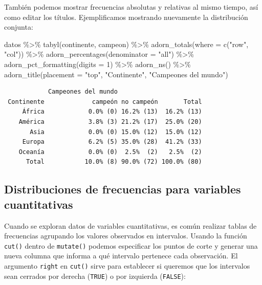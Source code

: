 \documentclass[
]{book}
\newenvironment{Shaded}{\begin{snugshade}}{\end{snugshade}}
\newcommand{\AttributeTok}[1]{\textcolor[rgb]{0.77,0.63,0.00}{#1}}
\newcommand{\DecValTok}[1]{\textcolor[rgb]{0.00,0.00,0.81}{#1}}
\newcommand{\FunctionTok}[1]{\textcolor[rgb]{0.00,0.00,0.00}{#1}}
\newcommand{\NormalTok}[1]{#1}
\newcommand{\SpecialCharTok}[1]{\textcolor[rgb]{0.00,0.00,0.00}{#1}}
\newcommand{\StringTok}[1]{\textcolor[rgb]{0.31,0.60,0.02}{#1}}
\begin{document}
También podemos mostrar frecuencias absolutas y relativas al mismo tiempo, así como editar los títulos. Ejemplificamos mostrando nuevamente la distribución conjunta:

\begin{Shaded}
\begin{Highlighting}[]
\NormalTok{datos }\SpecialCharTok{\%\textgreater{}\%} 
  \FunctionTok{tabyl}\NormalTok{(continente, campeon) }\SpecialCharTok{\%\textgreater{}\%} 
  \FunctionTok{adorn\_totals}\NormalTok{(}\AttributeTok{where =} \FunctionTok{c}\NormalTok{(}\StringTok{"row"}\NormalTok{, }\StringTok{"col"}\NormalTok{)) }\SpecialCharTok{\%\textgreater{}\%} 
  \FunctionTok{adorn\_percentages}\NormalTok{(}\AttributeTok{denominator =} \StringTok{"all"}\NormalTok{) }\SpecialCharTok{\%\textgreater{}\%} 
  \FunctionTok{adorn\_pct\_formatting}\NormalTok{(}\AttributeTok{digits =} \DecValTok{1}\NormalTok{) }\SpecialCharTok{\%\textgreater{}\%} 
  \FunctionTok{adorn\_ns}\NormalTok{() }\SpecialCharTok{\%\textgreater{}\%} 
  \FunctionTok{adorn\_title}\NormalTok{(}\AttributeTok{placement =} \StringTok{"top"}\NormalTok{, }\StringTok{"Continente"}\NormalTok{, }\StringTok{"Campeones del mundo"}\NormalTok{)}
\end{Highlighting}
\end{Shaded}

\begin{verbatim}
            Campeones del mundo                       
 Continente             campeón no campeón       Total
     África            0.0% (0) 16.2% (13)  16.2% (13)
    América            3.8% (3) 21.2% (17)  25.0% (20)
       Asia            0.0% (0) 15.0% (12)  15.0% (12)
     Europa            6.2% (5) 35.0% (28)  41.2% (33)
    Oceanía            0.0% (0)  2.5%  (2)   2.5%  (2)
      Total           10.0% (8) 90.0% (72) 100.0% (80)
\end{verbatim}

\hypertarget{distribuciones-de-frecuencias-para-variables-cuantitativas}{%
\subsection{Distribuciones de frecuencias para variables cuantitativas}\label{distribuciones-de-frecuencias-para-variables-cuantitativas}}

Cuando se exploran datos de variables cuantitativas, es común realizar tablas de frecuencias agrupando los valores observados en intervalos. Usando la función \texttt{cut()} dentro de \texttt{mutate()} podemos especificar los puntos de corte y generar una nueva columna que informa a qué intervalo pertenece cada observación. El argumento \texttt{right} en \texttt{cut()} sirve para establecer si queremos que los intervalos sean cerrados por derecha (\texttt{TRUE}) o por izquierda (\texttt{FALSE}):
\end{document}
